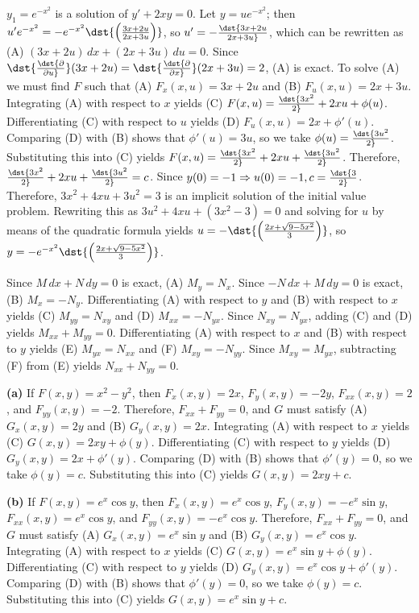 \documentclass[dvips]{book}
\renewcommand{\exer}[1]{\par\medskip\;\noindent{\color{red}\bf #1.}}
\numberwithin{example}{section}
\numberwithin{equation}{section}
\numberwithin{theorem}{section}
\numberwithin{table}{section}
\numberwithin{figure}{section}
\begin{document}
\exer{2.5.40}
$y_1=e^{-x^2}$ is a solution of $y'+2xy=0$.
Let $y=ue^{-x^2}$; then
$u'e^{-x^2}=-e^{-x^2}\dst{\left({3x+2u\over 2x+3u}\right)}$,
so  $u'=-\dst{3x+2u\over2x+3u}$, which can be rewritten as (A)
$(3x+2u)\,dx+(2x+3u)\,du=0$. Since $\dst{\dst{\partial
\over\partial
u}}(3x+2u)=\dst{\dst{\partial \over\partial x}}(2x+3u)=2$, (A)
is exact. To solve (A)
we must find $F$ such that
(A) $F_x(x,u)=3x+2u$ and
(B) $F_u(x,u)=2x+3u$.
Integrating (A) with respect to $x$ yields
(C) $F(x,u)=\dst{3x^2\over2}+2xu+\phi(u)$.
Differentiating (C) with respect to $u$  yields
(D) $F_u(x,u)=2x+\phi'(u)$.
Comparing (D) with (B)  shows that
$\phi'(u)=3u$, so we take
$\phi(u)=\dst{3u^2\over2}$.
Substituting this into (C) yields
$F(x,u)=\dst{3x^2\over2}+2xu+\dst{3u^2\over2}$.
Therefore, $\dst{3x^2\over2}+2xu+\dst{3u^2\over2}=c$.
Since $y(0)=-1\Rightarrow u(0)=-1,
c=\dst{3\over2}$. Therefore,  $3x^2+4xu+3u^2=3$
is an implicit solution of the initial value problem.
Rewriting this as $3u^2+4xu+(3x^2-3)=0$ and
 solving  for $u$ by means of the quadratic formula
yields $u=-\dst{\left(2x+\sqrt{9-5x^2}\over3\right)}$, so
 $y=-e^{-x^2}\dst{\left(2x+\sqrt{9-5x^2}\over3\right)}$.


\exer{2.5.42}
Since $M\,dx+N\,dy=0$ is exact,  (A) $M_y=N_x$.
Since $-N\,dx+M\,dy=0$ is exact,  (B) $M_x=-N_y$.
Differentiating (A) with respect to $y$ and (B) with respect to
$x$ yields (C) $M_{yy}=N_{xy}$ and (D) $M_{xx}=-N_{yx}$.
Since $N_{xy}=N_{yx}$, adding (C) and (D) yields $M_{xx}+M_{yy}=0$.
Differentiating (A) with respect to $x$ and (B) with respect to
$y$ yields (E) $M_{yx}=N_{xx}$ and (F) $M_{xy}=-N_{yy}$.
Since $M_{xy}=M_{yx}$, subtracting (F) from (E) yields
$N_{xx}+N_{yy}=0$.


\exer{2.5.44}
{\bf (a)}
If $F(x,y)=x^2-y^2$, then $F_x(x,y)=2x$, $F_y(x,y)=-2y$,
$F_{xx}(x,y)=2$, and $F_{yy}(x,y)=-2$.
Therefore, $F_{xx}+F_{yy}=0$, and $G$ must satisfy
(A) $G_x(x,y)=2y$ and (B) $G_y(x,y)=2x$.
Integrating (A) with respect to $x$ yields
(C) $G(x,y)=2xy+\phi(y)$.
Differentiating
(C) with respect to
$y$ yields
(D) $G_y(x,y)=2x+\phi'(y)$.
Comparing (D) with (B)  shows that
$\phi'(y)=0$, so we take
$\phi(y)=c$.
Substituting this into (C) yields
$G(x,y)=2xy+c$.

{\bf (b)}
If $F(x,y)=e^x\cos y$, then $F_x(x,y)=e^x\cos y$,
 $F_y(x,y)=-e^x\sin y$,
$F_{xx}(x,y)=e^x\cos y$, and $F_{yy}(x,y)=-e^x\cos y$.
Therefore, $F_{xx}+F_{yy}=0$, and $G$ must satisfy
(A) $G_x(x,y)=e^x\sin y$ and (B) $G_y(x,y)=e^x\cos y$.
Integrating (A) with respect to $x$ yields
(C) $G(x,y)=e^x\sin y+\phi(y)$.
Differentiating (C) with respect to $y$  yields
(D) $G_y(x,y)=e^x\cos y+\phi'(y)$.
Comparing (D) with (B)  shows that
$\phi'(y)=0$, so we take
$\phi(y)=c$.
Substituting this into (C) yields
$G(x,y)=e^x\sin y+c$.
\end{document}
